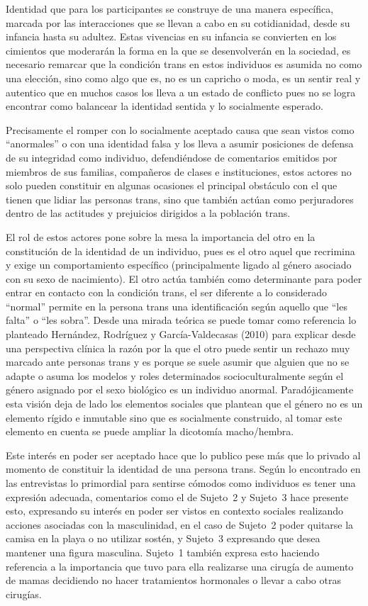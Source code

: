 Identidad que para los participantes se construye de una manera específica,
marcada por las interacciones que se llevan a cabo en su cotidianidad, desde su
infancia hasta su adultez.  Estas vivencias en su infancia se convierten en los
cimientos que moderarán la forma en la que se desenvolverán en la sociedad, es
necesario remarcar que la condición trans en estos individuos es asumida no como
una elección, sino como algo que es, no es un capricho o moda, es un sentir real
y autentico que en muchos casos los lleva a un estado de conflicto pues no se
logra encontrar como balancear la identidad sentida y lo socialmente esperado.

Precisamente el romper con lo socialmente aceptado causa que sean vistos como
“anormales” o con una identidad falsa y los lleva a asumir posiciones de defensa
de su integridad como individuo, defendiéndose de comentarios emitidos por
miembros de sus familias, compañeros de clases e instituciones, estos actores no
solo pueden constituir en algunas ocasiones el principal obstáculo con el que
tienen que lidiar las personas trans, sino que también actúan como perjuradores
dentro de las actitudes y prejuicios dirigidos a la población trans.

El rol de estos actores pone sobre la mesa la importancia del otro en la
constitución de la identidad de un individuo, pues es el otro aquel que
recrimina y exige un comportamiento específico (principalmente ligado al género
asociado con su sexo de nacimiento). El otro actúa también como determinante
para poder entrar en contacto con la condición trans, el ser diferente a lo
considerado “normal” permite en la persona trans una identificación según
aquello que “les falta” o “les sobra”. Desde una mirada teórica se puede tomar
como referencia lo planteado Hernández, Rodríguez y García-Valdecasas (2010)
para explicar desde una perspectiva clínica la razón por la que el otro puede
sentir un rechazo muy marcado ante personas trans y es porque se suele asumir
que alguien que no se adapte o asuma los modelos y roles determinados
socioculturalmente según el género asignado por el sexo biológico es un
individuo anormal. Paradójicamente esta visión deja de lado los elementos
sociales que plantean que el género no es un elemento rígido e inmutable sino
que es socialmente construido, al tomar este elemento en cuenta se puede ampliar
la dicotomía macho/hembra.

Este interés en poder ser aceptado hace que lo publico pese más que lo privado
al momento de constituir la identidad de una persona trans. Según lo encontrado
en las entrevistas lo primordial para sentirse cómodos como individuos es tener
una expresión adecuada, comentarios como el de Sujeto~2 y Sujeto~3 hace presente
esto, expresando su interés en poder ser vistos en contexto sociales realizando
acciones asociadas con la masculinidad, en el caso de Sujeto~2 poder quitarse la
camisa en la playa o no utilizar sostén, y Sujeto~3 expresando que desea
mantener una figura masculina. Sujeto~1 también expresa esto haciendo referencia
a la importancia que tuvo para ella realizarse una cirugía de aumento de mamas
decidiendo no hacer tratamientos hormonales o llevar a cabo otras cirugías.

